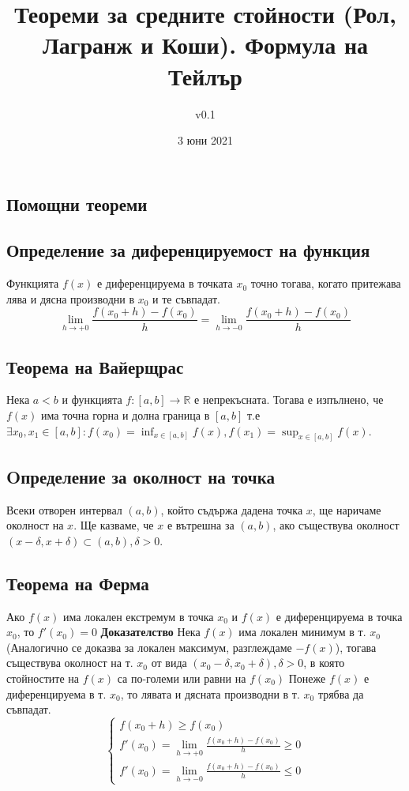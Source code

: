 \documentclass[fleqn,12pt]{article}
\title{Теореми  за  средните  стойности  (Рол,  Лагранж  и  Коши).  Формула  на Тейлър}
\author{v0.1}
\date{3 юни 2021}
\begin{document}
    
\maketitle

\tableofcontents

\begin{flushleft}
    
\section{Помощни теореми}

\subsection{Определение за диференцируемост на функция}
Функцията $f(x)$ е диференцируема в точката $x_0$ точно тогава, когато притежава лява и дясна производни в $x_0$ и те съвпадат.
\[\lim_{h \to +0} \frac{f(x_0 + h)-f(x_0)}{h} = \lim_{h \to -0} \frac{ f(x_0 + h)-f(x_0)}{h}\]

\subsection{Теорема на Вайерщрас}
Нека $a<b$ и функцията $f:[a,b]\rightarrow\mathbb{R}$ е непрекъсната. Тогава е изпълнено, че $f(x)$ има точна горна и долна граница в $[a,b]$
т.е $\exists x_0,x_1 \in [a,b]: f(x_0)=\inf_{x \in [a,b]} f(x), f(x_1)=\sup_{x \in [a,b]} f(x)$.

\subsection{Oпределение за околност на точка}
Всеки отворен интервал $(a,b)$, който съдържа дадена точка $x$, ще наричаме околност на $x$. Ще казваме, че $x$ е вътрешна за $(a,b)$, ако
съществува околност $(x-\delta,x+\delta) \subset (a,b), \delta > 0$.

\subsection{Теорема на Ферма}
Ако $f(x)$ има локален екстремум в точка $x_0$ и $f(x)$ е диференцируема в точка $x_0$, то $f'(x_0)=0$
\bigbreak
\textbf{Доказателство}
Нека $f(x)$ има локален минимум в т. $x_0$ (Аналогично се доказва за локален максимум, разглеждаме $-f(x)$),
тогава съществува околност на т. $x_0$ от вида $(x_0 - \delta,x_0 + \delta), \delta > 0$, в която стойностите на $f(x)$ са по-големи или равни на $f(x_0)$
Понеже $f(x)$ е диференцируема в т. $x_0$, то лявата и дясната производни в т. $x_0$ трябва да съвпадат.
\[
\begin{cases}
    f(x_0 + h) \geq f(x_0)\\
    f'(x_0) = \lim_{h \to +0} \frac{ f(x_0 + h)-f(x_0)}{h} \geq 0\\
    f'(x_0) = \lim_{h \to -0} \frac{ f(x_0 + h)-f(x_0)}{h} \leq 0
\end{cases}
\]


\end{flushleft}
\end{document}
